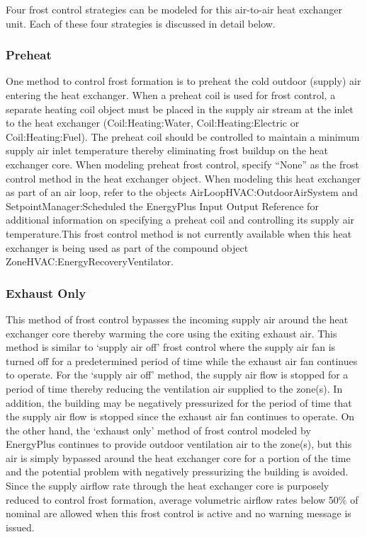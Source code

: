 Four frost control strategies can be modeled for this air-to-air heat exchanger unit. Each of these four strategies is discussed in detail below.

\subsubsection{Preheat}\label{preheat}

One method to control frost formation is to preheat the cold outdoor (supply) air entering the heat exchanger. When a preheat coil is used for frost control, a separate heating coil object must be placed in the supply air stream at the inlet to the heat exchanger (Coil:Heating:Water, Coil:Heating:Electric or Coil:Heating:Fuel). The preheat coil should be controlled to maintain a minimum supply air inlet temperature thereby eliminating frost buildup on the heat exchanger core. When modeling preheat frost control, specify ``None'' as the frost control method in the heat exchanger object. When modeling this heat exchanger as part of an air loop, refer to the objects AirLoopHVAC:OutdoorAirSystem and SetpointManager:Scheduled the EnergyPlus Input Output Reference for additional information on specifying a preheat coil and controlling its supply air temperature.This frost control method is not currently available when this heat exchanger is being used as part of the compound object ZoneHVAC:EnergyRecoveryVentilator.

\subsubsection{Exhaust Only}\label{exhaust-only}

This method of frost control bypasses the incoming supply air around the heat exchanger core thereby warming the core using the exiting exhaust air. This method is similar to `supply air off' frost control where the supply air fan is turned off for a predetermined period of time while the exhaust air fan continues to operate. For the `supply air off' method, the supply air flow is stopped for a period of time thereby reducing the ventilation air supplied to the zone(s). In addition, the building may be negatively pressurized for the period of time that the supply air flow is stopped since the exhaust air fan continues to operate. On the other hand, the `exhaust only' method of frost control modeled by EnergyPlus continues to provide outdoor ventilation air to the zone(s), but this air is simply bypassed around the heat exchanger core for a portion of the time and the potential problem with negatively pressurizing the building is avoided. Since the supply airflow rate through the heat exchanger core is purposely reduced to control frost formation, average volumetric airflow rates below 50\% of nominal are allowed when this frost control is active and no warning message is issued.

